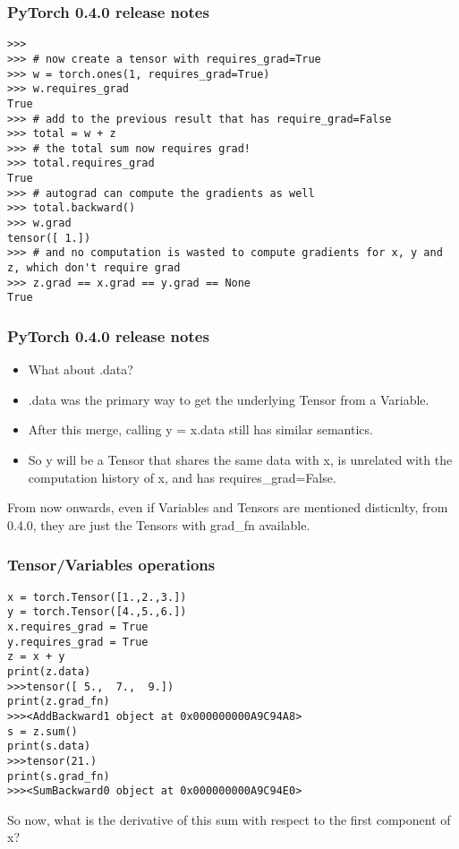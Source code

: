 \begin{frame}[fragile]
\frametitle{PyTorch 0.4.0 release notes}

 \begin{lstlisting}
>>>
>>> # now create a tensor with requires_grad=True
>>> w = torch.ones(1, requires_grad=True)
>>> w.requires_grad
True
>>> # add to the previous result that has require_grad=False
>>> total = w + z
>>> # the total sum now requires grad!
>>> total.requires_grad
True
>>> # autograd can compute the gradients as well
>>> total.backward()
>>> w.grad
tensor([ 1.])
>>> # and no computation is wasted to compute gradients for x, y and z, which don't require grad
>>> z.grad == x.grad == y.grad == None
True
 \end{lstlisting}
 \end{frame} 
 
\begin{frame}[fragile]
\frametitle{PyTorch 0.4.0 release notes}

\begin{itemize}
\item What about .data?
\item .data was the primary way to get the underlying Tensor from a Variable. 
\item After this merge, calling y = x.data still has similar semantics.
\item So y will be a Tensor that shares the same data with x, is unrelated with the computation history of x, and has requires\_grad=False.
\end{itemize}

From now onwards, even if Variables and Tensors are mentioned disticnlty, from 0.4.0, they are just the Tensors with grad\_fn available.
\end{frame} 
 
 
  
\begin{frame}[fragile]
\frametitle{Tensor/Variables operations}

 \begin{lstlisting}
x = torch.Tensor([1.,2.,3.])
y = torch.Tensor([4.,5.,6.])
x.requires_grad = True
y.requires_grad = True
z = x + y
print(z.data)
>>>tensor([ 5.,  7.,  9.])
print(z.grad_fn)
>>><AddBackward1 object at 0x000000000A9C94A8>
s = z.sum()
print(s.data)
>>>tensor(21.)
print(s.grad_fn)
>>><SumBackward0 object at 0x000000000A9C94E0>
 \end{lstlisting}
So now, what is the derivative of this sum with respect to the first component of x? 
 \end{frame} 
 
